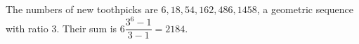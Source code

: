 The numbers of new toothpicks are $6,18,54,162,486,1458$, a geometric sequence with ratio 3. Their sum is $6\dfrac{3^6-1}{3-1}=\boxed{2184}$.
